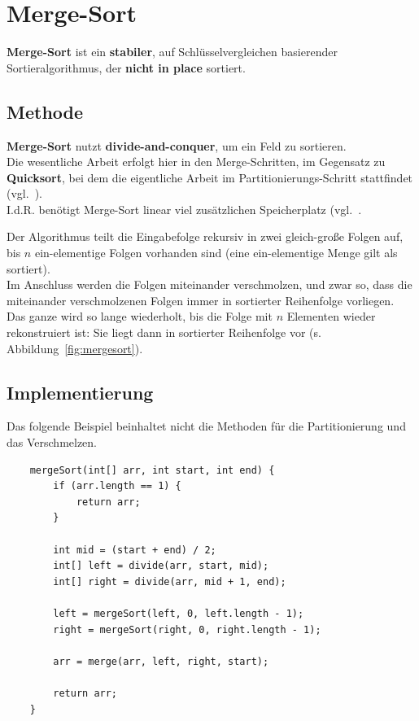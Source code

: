 \section{Merge-Sort}

\textbf{Merge-Sort} ist ein \textbf{stabiler}, auf Schlüsselvergleichen basierender Sortieralgorithmus, der \textbf{nicht in place} sortiert.

\subsection{Methode}

\textbf{Merge-Sort} nutzt \textbf{divide-and-conquer}, um ein Feld zu sortieren.\\
Die wesentliche Arbeit erfolgt hier in den Merge-Schritten, im Gegensatz zu \textbf{Quicksort}, bei dem die eigentliche Arbeit im Partitionierungs-Schritt stattfindet (vgl.~\cite[174]{GD18e}).\\
I.d.R. benötigt Merge-Sort linear viel zusätzlichen Speicherplatz (vgl.~\cite[112]{OW17b}.

\noindent
Der Algorithmus teilt die Eingabefolge rekursiv in zwei gleich-große Folgen auf, bis $n$ ein-elementige Folgen vorhanden sind (eine ein-elementige Menge gilt als sortiert).\\
Im Anschluss werden die Folgen miteinander verschmolzen, und zwar so, dass die miteinander verschmolzenen Folgen immer in sortierter Reihenfolge vorliegen.\\
Das ganze wird so lange wiederholt, bis die Folge mit $n$ Elementen wieder rekonstruiert ist: Sie liegt dann in sortierter Reihenfolge vor (s. Abbildung~\ref{fig:mergesort}).\\


\subsection{Implementierung}

Das folgende Beispiel beinhaltet nicht die Methoden für die Partitionierung und das Verschmelzen.

\begin{verbatim}
    mergeSort(int[] arr, int start, int end) {
        if (arr.length == 1) {
            return arr;
        }

        int mid = (start + end) / 2;
        int[] left = divide(arr, start, mid);
        int[] right = divide(arr, mid + 1, end);

        left = mergeSort(left, 0, left.length - 1);
        right = mergeSort(right, 0, right.length - 1);

        arr = merge(arr, left, right, start);

        return arr;
    }
\end{verbatim}

